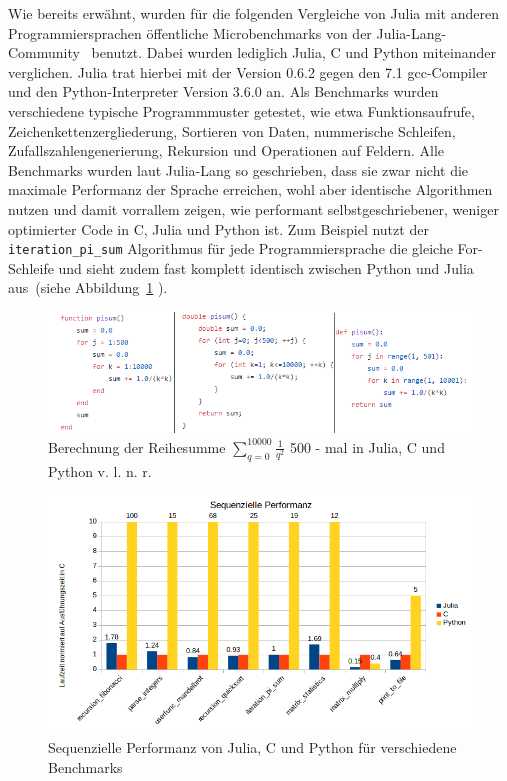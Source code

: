 \documentclass[proseminar,german,utf8]{zihpub}
\begin{document}
Wie bereits erwähnt, wurden für die folgenden Vergleiche von Julia mit anderen Programmiersprachen öffentliche Microbenchmarks von der Julia-Lang-Community~\cite{JuliaMicroBenchmarks} benutzt. Dabei wurden lediglich Julia, C und Python miteinander verglichen. Julia trat hierbei mit der Version 0.6.2 gegen den 7.1 gcc-Compiler und den Python-Interpreter Version 3.6.0 an. Als Benchmarks wurden verschiedene typische Programmmuster getestet, wie etwa Funktionsaufrufe, Zeichenkettenzergliederung, Sortieren von Daten, nummerische Schleifen, Zufallszahlengenerierung, Rekursion und Operationen auf Feldern. Alle Benchmarks wurden laut Julia-Lang so geschrieben, dass sie zwar nicht die maximale Performanz der Sprache erreichen, wohl aber identische Algorithmen nutzen und damit vorrallem zeigen, wie performant selbstgeschriebener, weniger optimierter Code in C, Julia und Python ist. Zum Beispiel nutzt der \verb|iteration_pi_sum| Algorithmus für jede Programmiersprache die gleiche For-Schleife und sieht zudem fast komplett identisch zwischen Python und Julia aus~(siehe Abbildung~\ref{fig:pisum} ).

\begin{figure}[hbt!]
  \centering
  \includegraphics[scale=2.5]{bilder/pisum.png}
  \caption{Berechnung der Reihesumme $\sum_{q=0}^{10000} \frac{1}{q^{2}}$ 500 - mal in Julia, C und Python v. l. n. r. }
  \label{fig:pisum}
\end{figure}

\begin{figure}[hbt!]
  \centering
  \includegraphics[scale=0.8]{bilder/sequenziell_performance.png}
  \caption{Sequenzielle Performanz von Julia, C und Python für verschiedene Benchmarks}
  \label{fig:sequPerform}
\end{figure}
\end{document}

